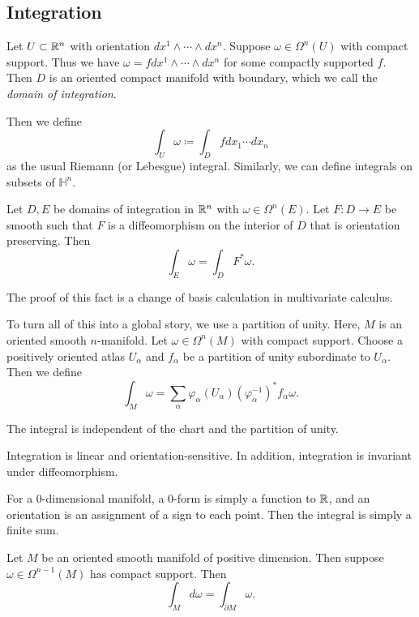 \documentclass[twoside, 10pt]{article}
\renewcommand{\H}{\mathbb{H}}
\begin{document}
    \subsection{Integration}%
    \label{sub:integration}
    
    Let $U \subset \mathbb{R}^n$ with orientation $dx^1 \wedge \cdots \wedge dx^n$. Suppose $\omega \in \Omega^n(U)$ with compact support. Thus we have $\omega = f dx^1 \wedge \cdots \wedge dx^n$ for some compactly supported $f$. Then $D$ is an oriented compact manifold with boundary, which we call the \textit{domain of integration}.

    Then we define
    \[ \int_U \omega \coloneqq \int_D f dx_1 \cdots dx_n\]
    as the usual Riemann (or Lebesgue) integral. Similarly, we can define integrals on subsets of $\H^n$.

    \begin{prop}
        Let $D,E$ be domains of integration in $\mathbb{R}^n$ with $\omega \in \Omega^n(E)$. Let $F:D \to E$ be smooth such that $F$ is a diffeomorphism on the interior of $D$ that is orientation preserving. Then
        \[ \int_E \omega = \int_D F^*\omega.\]
    \end{prop}

    The proof of this fact is a change of basis calculation in multivariate calculus.

    To turn all of this into a global story, we use a partition of unity. Here, $M$ is an oriented smooth $n$-manifold. Let $\omega \in \Omega^n(M)$ with compact support. Choose a positively oriented atlas $U_{\alpha}$ and $f_{\alpha}$ be a partition of unity subordinate to $U_{\alpha}$. Then we define
    \[ \int_M \omega = \sum_{\alpha} \varphi_{\alpha}(U_{\alpha}) (\varphi_{\alpha}^{-1})^* f_{\alpha} \omega.\]

    \begin{lem}
        The integral is independent of the chart and the partition of unity.
    \end{lem}

    \begin{prop}
        Integration is linear and orientation-sensitive. In addition, integration is invariant under diffeomorphism.
    \end{prop}

    For a $0$-dimensional manifold, a $0$-form is simply a function to $\mathbb{R}$, and an orientation is an assignment of a sign to each point. Then the integral is simply a finite sum.

    \begin{thm}[Stokes]
        Let $M$ be an oriented smooth manifold of positive dimension. Then suppose $\omega \in \Omega^{n-1}(M)$ has compact support. Then
        \[ \int_M d\omega = \int_{\partial M} \omega.\]
    \end{thm}
\end{document}
